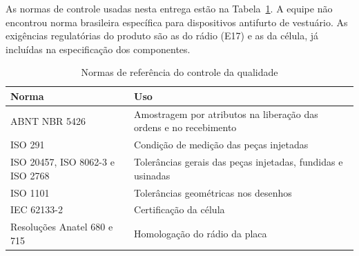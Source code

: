 As normas de controle usadas nesta entrega estão na Tabela~\ref{tab:ctrl_normas}. A equipe não encontrou norma brasileira específica para dispositivos antifurto de vestuário. As exigências regulatórias do produto são as do rádio (E17) e as da célula, já incluídas na especificação dos componentes.

\begin{table}[htbp]
    \centering
    \caption{Normas de referência do controle da qualidade}
    \label{tab:ctrl_normas}
    \footnotesize
    \renewcommand{\arraystretch}{1.3}
    \begin{tabularx}{\textwidth}{@{}
        >{\RaggedRight\arraybackslash}p{3.4cm}
        >{\RaggedRight\arraybackslash}X@{}}
        \toprule
        \textbf{Norma} & \textbf{Uso} \\
        \midrule
        ABNT NBR 5426 & Amostragem por atributos na liberação das ordens e no recebimento \\
        ISO 291 & Condição de medição das peças injetadas \\
        ISO 20457, ISO 8062-3 e ISO 2768 & Tolerâncias gerais das peças injetadas, fundidas e usinadas \\
        ISO 1101 & Tolerâncias geométricas nos desenhos \\
        IEC 62133-2 & Certificação da célula \\
        Resoluções Anatel 680 e 715 & Homologação do rádio da placa \\
        \bottomrule
    \end{tabularx}
\end{table}

